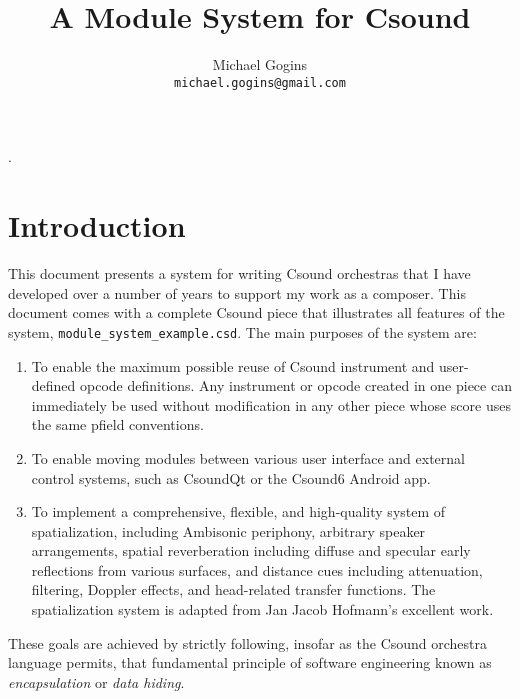 \documentclass[12pt,letterpaper,onecolumn]{scrartcl}
\begin{document}
.
\title{A Module System for Csound}
\author{Michael Gogins \\ \texttt{michael.gogins@gmail.com}}
\maketitle

\mainmatter
\section{Introduction}
\label{sec:Introduction}

This document presents a system for writing Csound orchestras that I have developed over a number of years to support my work as a composer. This document comes with a complete Csound piece that illustrates all features of the system, \texttt{module\_system\_example.csd}. The main purposes of the system are:

\begin{enumerate}
	\item To enable the maximum possible reuse of Csound instrument and user-defined opcode definitions. Any instrument or opcode created in one piece can immediately be used without modification in any other piece whose score uses the same pfield conventions.
	\item To enable moving modules between various user interface and external control systems, such as CsoundQt or the Csound6 Android app. 
	\item To implement a comprehensive, flexible, and high-quality system of spatialization, including Ambisonic periphony, arbitrary speaker arrangements, spatial reverberation including diffuse and specular early reflections from various surfaces, and distance cues including attenuation, filtering, Doppler effects, and head-related transfer functions. The spatialization system is adapted from Jan Jacob Hofmann's excellent work. 
	
\end{enumerate}

\noindent These goals are achieved by strictly following, insofar as the Csound orchestra language permits, that fundamental principle of software engineering known as \emph{encapsulation} or \emph{data hiding}. 
\end{document}
